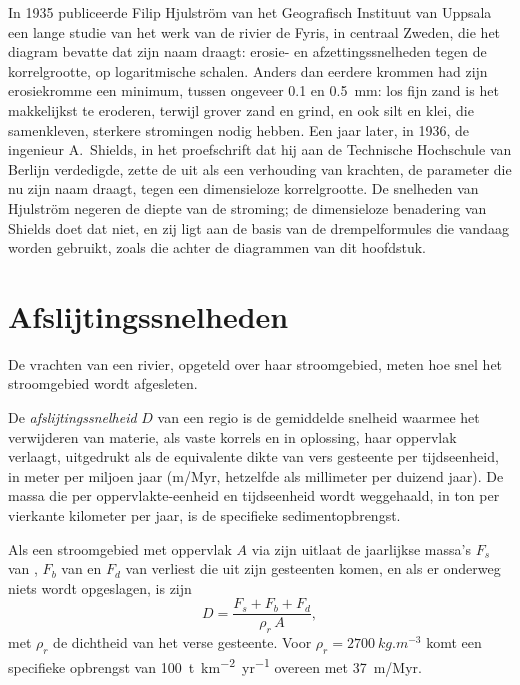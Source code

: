 \begin{history}
In 1935 publiceerde Filip Hjulström van het Geografisch Instituut van Uppsala een lange studie van het werk van de rivier de Fyris, in centraal Zweden, die het diagram bevatte dat zijn naam draagt: erosie- en afzettingssnelheden tegen de korrelgrootte, op logaritmische schalen. Anders dan eerdere krommen had zijn erosiekromme een minimum, tussen ongeveer \num{0.1} en \qty{0.5}{mm}: los fijn zand is het makkelijkst te eroderen, terwijl grover zand en grind, en ook silt en klei, die samenkleven, sterkere stromingen nodig hebben. Een jaar later, in 1936, de ingenieur A.~Shields,
in het proefschrift dat hij aan de Technische Hochschule van Berlijn verdedigde, zette de  uit als een verhouding van krachten, de parameter die nu zijn naam draagt, tegen een dimensieloze korrelgrootte. De snelheden van Hjulström negeren de diepte van de stroming; de dimensieloze benadering van Shields doet dat niet, en zij ligt aan de basis van de drempelformules die vandaag worden gebruikt, zoals die achter de diagrammen van dit hoofdstuk.
\end{history}

\section{Afslijtingssnelheden}\label{sec:b1:erosion-transport:denudation}

De vrachten van een rivier, opgeteld over haar stroomgebied, meten hoe snel het stroomgebied wordt afgesleten.

\begin{definition}[Afslijtingssnelheid]\label{def:b1:erosion-transport:denudation}
De \emph{afslijtingssnelheid} $D$ van een regio is de gemiddelde snelheid waarmee het verwijderen van materie, als vaste korrels en in oplossing, haar oppervlak verlaagt, uitgedrukt als de equivalente dikte van vers gesteente per tijdseenheid, in meter per miljoen jaar (\unit{m/Myr}, hetzelfde als millimeter per duizend jaar). De massa die per oppervlakte-eenheid en tijdseenheid wordt weggehaald, in ton per vierkante kilometer per jaar, is de specifieke sedimentopbrengst.
\end{definition}

\begin{proposition}\label{prop:b1:erosion-transport:denudation}
Als een stroomgebied met oppervlak $A$ via zijn uitlaat de jaarlijkse massa's $F_s$ van , $F_b$ van  en $F_d$ van  verliest die uit zijn gesteenten komen, en als er onderweg niets wordt opgeslagen, is zijn 
\[
  D = \frac{F_s + F_b + F_d}{\rho_r\,A},
\]
met $\rho_r$ de dichtheid van het verse gesteente. Voor $\rho_r =
\qty{2700}{kg.m^{-3}}$ komt een specifieke opbrengst van \qty{100}{t.km^{-2}.yr^{-1}} overeen met \qty{37}{m/Myr}.
\end{proposition}

